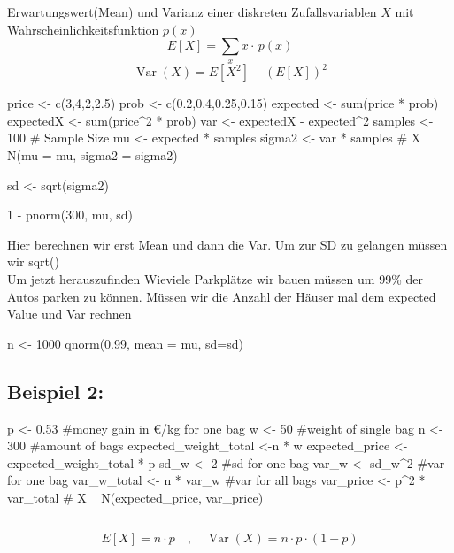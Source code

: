 \newpage


\section{}
\subsection{}
Erwartungswert(Mean) und Varianz einer diskreten Zufallsvariablen $X$ mit Wahrscheinlichkeitsfunktion $p(x)$
\large{
\[
E[X] = \sum_{x} x \cdot\, p(x)
\]
\[
\operatorname{Var}(X) = E\left[X^2\right] - \left(E\left[X\right]\right)^2
\]
}
\normalsize
\begin{rcode}{1}
price <- c(3,4,2,2.5)
prob <- c(0.2,0.4,0.25,0.15)
expected <- sum(price * prob)
expectedX <- sum(price^2 * prob)
var <- expectedX - expected^2
samples <- 100 # Sample Size
mu <- expected * samples
sigma2 <- var * samples
# X ~ N(mu = mu, sigma2 = sigma2)
\end{rcode}
\begin{rcode}{1}
sd <- sqrt(sigma2)

1 - pnorm(300, mu, sd)
\end{rcode}
Hier berechnen wir erst Mean und dann die Var. Um zur SD zu gelangen müssen wir sqrt()\\
Um jetzt herauszufinden Wieviele Parkplätze wir bauen müssen um 99\% der Autos parken zu können. Müssen wir die Anzahl der Häuser mal dem expected Value und Var rechnen
\begin{rcode}{1}
n <- 1000
qnorm(0.99, mean = mu, sd=sd)
\end{rcode}
\subsection{Beispiel 2:}
\begin{rcode}{1}
p <- 0.53           #money gain in €/kg for one bag
w <- 50                  #weight of single bag
n <- 300                 #amount of bags
expected_weight_total <-n * w
expected_price <- expected_weight_total * p
sd_w <- 2                #sd for one bag
var_w <- sd_w^2          #var for one bag
var_w_total <- n * var_w #var for all bags
var_price <- p^2 * var_total
# X ~ N(expected_price, var_price)
\end{rcode} 
\subsection{}
\large
\[
E[X] = n \cdot p \quad, \quad \operatorname{Var}(X) =n \cdot p \cdot (1-p)
\]

